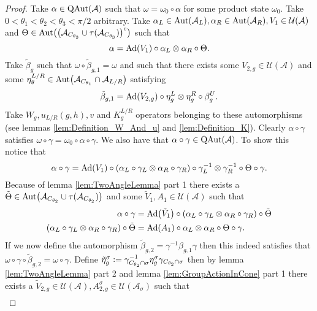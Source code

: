 \documentclass[12pt,a4paper,twoside]{article}
\newcommand{\defeq}{\vcentcolon=}
\let\originalleft\left
\let\originalright\right
\renewcommand{\left}{\mathopen{}\mathclose\bgroup\originalleft}
\renewcommand{\right}{\aftergroup\egroup\originalright}
\newcommand{\UU}{\mathcal U}
\renewcommand{\AA}{\mathcal A}
\newcommand{\Ad}[1]{\textrm{Ad}\left(#1\right)}
\newcommand{\Aut}[1]{\textrm{Aut}\left(#1\right)}
\newcommand{\QAut}[1]{\textrm{QAut}\left(#1\right)}
\theoremstyle{definition}
\numberwithin{equation}{section}
\begin{document}
\begin{proof}
	Take $\alpha\in\QAut{\AA}$ such that $\omega=\omega_0\circ\alpha$ for some product state $\omega_0$. Take $0<\theta_1<\theta_2<\theta_3<\pi/2$ arbitrary. Take $\alpha_L\in\Aut{\AA_L},\alpha_R\in\Aut{\AA_R},V_1\in\UU(\AA)$ and $\Theta\in\Aut{\left(\AA_{C_{\theta_3}} \cup \tau(\AA_{C_{\theta_3}})\right)^c}$ such that
	\begin{equation}
		\alpha=\Ad{V_1}\circ\alpha_L\otimes\alpha_R\circ\Theta.
	\end{equation}
	Take $\tilde{\beta}_g$ such that $\omega\circ\tilde{\beta}_{g,1}=\omega$ and such that there exists some $V_{2,g}\in\UU(\AA)$ and some $\eta_g^{L/R}\in\Aut{\AA_{C_{\theta_1}}\cap\AA_{L/R}}$ satisfying
	\begin{equation}
		\tilde{\beta}_{g,1}=\Ad{V_{2,g}}\circ\eta_{g}^L\otimes\eta_{g}^R\circ\beta_g^U.
	\end{equation}
	Take $W_g,u_{L/R}(g,h),v$ and $K_g^{L/R}$ operators belonging to these automorphisms (see lemmas \ref{lem:Definition_W_And_u} and \ref{lem:Definition_K}). Clearly $\alpha\circ\gamma$ satisfies $\omega\circ\gamma=\omega_0\circ\alpha\circ\gamma$. We also have that $\alpha\circ\gamma\in\QAut{\AA}$. To show this notice that
	\begin{equation}
		\alpha\circ\gamma=\Ad{V_1}\circ(\alpha_L\circ\gamma_{L}\otimes\alpha_R\circ\gamma_{R})\circ\gamma_{L}^{-1}\otimes\gamma_{R}^{-1}\circ\Theta\circ\gamma.
	\end{equation}
	Because of lemma \ref{lem:TwoAngleLemma} part 1 there exists a $\tilde{\Theta}\in\Aut{\AA_{C_{\theta_2}}\cup\tau(\AA_{C_{\theta_2}})}$ and some $\tilde V_1,A_1\in\UU(\AA)$ such that
	\begin{align}
		\alpha\circ\gamma&=\Ad{\tilde V_1}\circ(\alpha_L\circ\gamma_{L}\otimes\alpha_R\circ\gamma_{R})\circ\tilde\Theta\\
		(\alpha_L\circ\gamma_{L}\otimes\alpha_R\circ\gamma_{R})\circ\tilde\Theta&=\Ad{A_1}\circ \alpha_L\otimes\alpha_R\circ\Theta\circ\gamma.
	\end{align}
	If we now define the automorphism $\tilde{\beta}_{g,2}=\gamma^{-1}\beta_{g,1}\gamma$ then this indeed satisfies that $\omega\circ\gamma\circ\tilde{\beta}_{g,2}=\omega\circ\gamma$. Define $\tilde\eta_g^\sigma\defeq\gamma_{C_{\theta_2}\cap\sigma}^{-1}\eta_g^\sigma\gamma_{C_{\theta_2}\cap\sigma}$ then by lemma \ref{lem:TwoAngleLemma} part 2 and lemma \ref{lem:GroupActionInCone} part 1 there exists a $\tilde V_{2,g}\in\UU(\AA),A_{2,g}^{\sigma}\in\UU(\AA_\sigma)$ such that
	\begin{align}

\end{align}
\end{proof}
\end{document}

